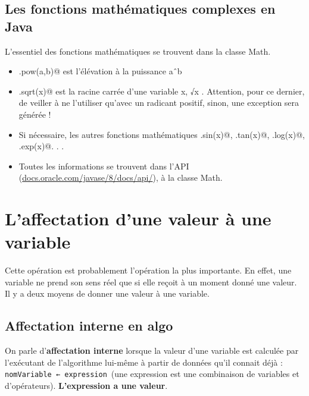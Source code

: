 \documentclass[11pt,a4paper]{article}
\begin{document}
            \par
        \subsection{Les fonctions math\'ematiques complexes en Java}
        L'essentiel des fonctions math\'ematiques se trouvent dans la classe Math.
          
					\begin{itemize}
				
			\item \verb@Math.pow(a,b)@ est l'\'el\'evation \`a la puissance aˆb
			\item \verb@Math.sqrt(x)@ est la racine carr\'ee d'une variable x, √x . Attention, pour ce dernier, de veiller \`a ne l'utiliser qu'avec un radicant positif, sinon, une exception sera g\'en\'er\'ee !
			\item Si n\'ecessaire, les autres fonctions math\'ematiques \verb@Math.sin(x)@, 
            \verb@Math.tan(x)@, \verb@Math.log(x)@, \verb@Math.exp(x)@. . .
			\item Toutes les informations se trouvent dans l'API (\url{docs.oracle.com/javase/8/docs/api/}), \`a la classe Math.
					\end{itemize}
				
            \par
        \section{L'affectation d'une valeur \`a une variable}
				Cette op\'eration est probablement l'op\'eration la plus importante. En effet, une variable ne
        prend son sens r\'eel que si elle re\c coit \`a un moment donn\'e une valeur. Il y a deux moyens de
        donner une valeur \`a une variable.
      
            \par
        \subsection{Affectation interne en algo}
          On parle d'\textbf{affectation interne} lorsque la valeur d'une variable est \guillemotleft  calcul\'ee \guillemotright  par l'ex\'ecutant
          de l'algorithme lui-m\^eme \`a partir de donn\'ees qu'il connait d\'ej\`a :
          \,\verb|nomVariable ← expression|\,
          (une expression est une combinaison de variables et d'op\'erateurs). \textbf{L'expression a une valeur}.
        
\end{document}

